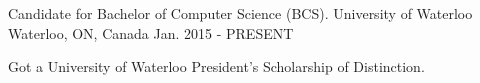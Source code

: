 

\begin{cventries}

  \cventry
    {Candidate for Bachelor of Computer Science (BCS).} %
    {University of Waterloo} %
    {Waterloo, ON, Canada} %
    {Jan. 2015 - PRESENT} %
    {
      \begin{cvitems} %
        \item {Got a University of Waterloo President's Scholarship of Distinction.}
      \end{cvitems}
    }

\end{cventries}
